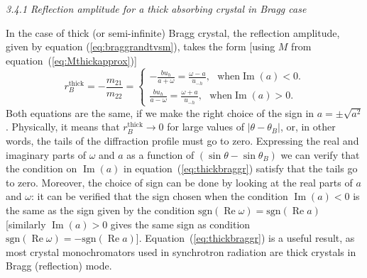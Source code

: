 \documentclass[preprint]{iucr}              %
\newcommand{\todo}[1]{{\color{red}[TODO: "#1'']}}
\newcommand{\inblue}[1]{{\color{blue}#1}}
\begin{document}
\textit{3.4.1  Reflection amplitude for a thick absorbing crystal in Bragg case}

In the case of thick (or semi-infinite) Bragg crystal, the reflection amplitude, given by equation (\ref{eq:braggrandtvsm}), takes the form [using $M$ from equation~(\ref{eq:Mthickapprox})]
\begin{equation}\label{eq:thickbraggr}
    r_B^{\text{thick}} = -\frac{m_{21}}{m_{22}} =
    \begin{cases} 
    -\frac{b u_h}{a+\omega}=\frac{\omega-a}{u_{-h}}, ~~~ \text{when} \operatorname{Im}(a)<0.
    \\
    \frac{b u_h}{a-\omega} = \frac{\omega+a}{u_{-h}}, ~~~ \text{when} \operatorname{Im}(a)>0.
    \end{cases}
\end{equation}
\inblue{
Both equations are the same, if we make the right choice of the sign in $a=\pm \sqrt{a^2}$. Physically, it means that $r_B^{\text{thick}} \rightarrow 0$ for large values of $|\theta-\theta_B|$, or, in other words, the tails of the diffraction profile must go to zero. Expressing the real and imaginary parts of $\omega$ and $a$ as a function of $(\sin\theta-\sin\theta_B)$ we can verify that the condition on $\operatorname{Im}(a)$ in equation~(\ref{eq:thickbraggr}) satisfy that the tails go to zero. Moreover, the choice of sign can be done by looking at the real parts of $a$ and $\omega$: it can be verified that the sign chosen when the condition $\operatorname{Im}(a)< 0$ is the same as the sign given by the condition $\text{sgn}(\operatorname{Re}\omega)= \text{sgn}(\operatorname{Re}a)$
[similarly $\operatorname{Im}(a) > 0$ gives the same sign as condition $\text{sgn}(\operatorname{Re}\omega)= -\text{sgn}(\operatorname{Re}a)$]. 
}
Equation~(\ref{eq:thickbraggr}) is a useful result, as most crystal monochromators used in synchrotron radiation are thick crystals in Bragg (reflection) mode. 

\end{document}
